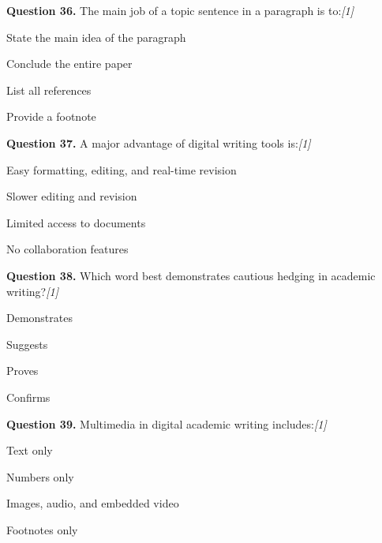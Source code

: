 \documentclass[11pt,a4paper]{article}
\newcommand{\pts}[1]{\hfill   \textit{[#1]}}
\begin{document}
\medskip




\noindent   \textbf{Question 36.} The main job of a topic sentence in a paragraph is to:\pts{1}

\begin{parts}
  \item State the main idea of the paragraph
  \item Conclude the entire paper
  \item List all references
  \item Provide a footnote
\end{parts}

\medskip




\noindent   \textbf{Question 37.} A major advantage of digital writing tools is:\pts{1}

\begin{parts}
  \item Easy formatting, editing, and real-time revision
  \item Slower editing and revision
  \item Limited access to documents
  \item No collaboration features
\end{parts}

\medskip




\noindent   \textbf{Question 38.} Which word best demonstrates cautious hedging in academic writing?\pts{1}

\begin{parts}
  \item Demonstrates
  \item Suggests
  \item Proves
  \item Confirms
\end{parts}

\medskip




\noindent   \textbf{Question 39.} Multimedia in digital academic writing includes:\pts{1}

\begin{parts}
  \item Text only
  \item Numbers only
  \item Images, audio, and embedded video
  \item Footnotes only
\end{parts}
\end{document}
